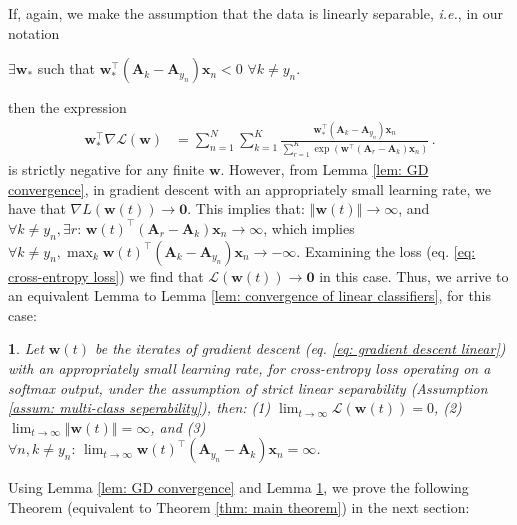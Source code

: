 \documentclass[twoside,11pt,english]{article}
\newtheorem{lem}[thm]{\protect\lemmaname}
\providecommand{\lemmaname}{Lemma}
\providecommand{\lemmaname}{Lemma}
\begin{document}
If, again, we make the assumption that the data is linearly
separable, \emph{i.e.}, in our notation

{\assm $\exists\mathbf{w}_{*}$ such that $\mathbf{w}_{*}^{\top}\left(\mathbf{A}_{k}-\mathbf{A}_{y_{n}}\right)\mathbf{x}_{n}<0$
$\forall k\neq y_{n}$. \label{assum: multi-class seperability} }

then the expression 
\begin{align*}
\mathbf{w}_{*}^{\top}\nabla\mathcal{L}\left(\mathbf{w}\right) & =\sum_{n=1}^{N}\sum_{k=1}^{K}\frac{\mathbf{w}_{*}^{\top}\left(\mathbf{A}_{k}-\mathbf{A}_{y_{n}}\right)\mathbf{x}_{n}}{\sum_{r=1}^{K}\exp\left(\mathbf{w}^{\top}\left(\mathbf{A}_{r}-\mathbf{A}_{k}\right)\mathbf{x}_{n}\right)}\,.
\end{align*}
is strictly negative for any finite $\mathbf{w}$. However, from Lemma
\ref{lem: GD convergence}, in gradient descent with an appropriately small learning rate, we have that $\nabla L\left(\mathbf{w}\left(t\right)\right)\rightarrow\mathbf{0}$.
This implies that: $\left\Vert \mathbf{w}\left(t\right)\right\Vert \rightarrow\infty$,
and $\forall k\neq y_{n},\exists r:\,\mathbf{w}\left(t\right)^{\top}\left(\mathbf{A}_{r}-\mathbf{A}_{k}\right)\mathbf{x}_{n}\rightarrow\infty$,
which implies $\forall k\neq y_{n},\max_{k}\mathbf{w}\left(t\right)^{\top}\left(\mathbf{A}_{k}-\mathbf{A}_{y_{n}}\right)\mathbf{x}_{n}\rightarrow-\infty$.
Examining the loss (eq. \ref{eq: cross-entropy loss}) we find that
$\mathcal{L}\left(\mathbf{w}\left(t\right)\right)\rightarrow\mathbf{0}$
in this case. Thus, we arrive to an equivalent Lemma to Lemma \ref{lem: convergence of linear classifiers},
for this case: 
\begin{lem}
\label{lem: convergence of softmax-cross-entropy}Let $\mathbf{w}\left(t\right)$
be the iterates of gradient descent (eq. \ref{eq: gradient descent linear})
with an appropriately small learning rate, for cross-entropy loss operating on a softmax
output, under the assumption of strict linear separability (Assumption
\ref{assum: multi-class seperability}), then: (1) $\lim_{t\rightarrow\infty}\mathcal{L}\left(\mathbf{w}\left(t\right)\right)=0$,
(2) $\lim_{t\rightarrow\infty}\left\Vert \mathbf{w}\left(t\right)\right\Vert =\infty$,
and (3) $\forall n,k\neq y_{n}:\,\lim_{t\rightarrow\infty}\mathbf{w}\left(t\right)^{\top}\left(\mathbf{A}_{y_{n}}-\mathbf{A}_{k}\right)\mathbf{x}_{n}=\infty$. 
\end{lem}
Using Lemma \ref{lem: GD convergence} and Lemma \ref{lem: convergence of softmax-cross-entropy}, we prove the following Theorem (equivalent to Theorem \ref{thm: main theorem}) in the next section:
\end{document}
